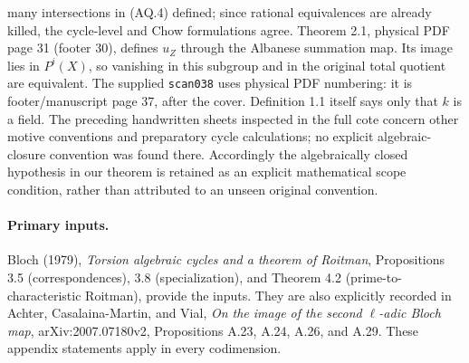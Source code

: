 many intersections in (AQ.4) defined; since rational
equivalences are already killed, the cycle-level and
Chow formulations agree. Theorem 2.1, physical PDF
page 31 (footer 30), defines $u_Z$ through the
Albanese summation map. Its image lies in $P^i(X)$,
so vanishing in this subgroup and in the original
total quotient are equivalent. The supplied
\texttt{scan038} uses physical PDF numbering:
it is footer/manuscript page 37, after the cover.
Definition 1.1 itself says only that $k$ is a field.
The preceding handwritten sheets inspected in the full
cote concern other motive conventions and preparatory
cycle calculations; no explicit algebraic-closure
convention was found there. Accordingly the
algebraically closed hypothesis in our theorem is
retained as an explicit mathematical scope condition,
rather than attributed to an unseen original convention.

\paragraph{Primary inputs.}
Bloch (1979), \emph{Torsion algebraic cycles and a theorem of Roitman},
Propositions 3.5 (correspondences), 3.8 (specialization), and
Theorem 4.2 (prime-to-characteristic Roitman), provide the inputs.
They are also explicitly recorded in Achter, Casalaina-Martin,
and Vial, \emph{On the image of the second $\ell$-adic Bloch map},
arXiv:2007.07180v2, Propositions A.23, A.24, A.26, and A.29.
These appendix statements apply in every codimension.

